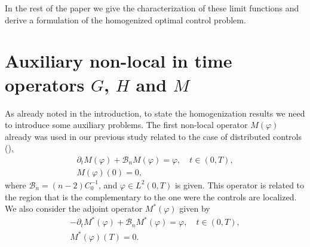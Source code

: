 \documentclass[10pt,a4paper]{amsart}
\numberwithin{equation}{section}
\begin{document}
In the rest of the paper we  give the characterization of these limit
functions and derive a formulation of the homogenized optimal control
problem.

\section{Auxiliary non-local in time operators $G$, $H$ and $M$}\label{sec:aux}

As already  noted in the introduction, to state the homogenization
results we need to introduce some auxiliary problems. The first non-local
operator $M(\varphi )$ already was used in our previous study related to the
case of distributed controls (\cite{DiPoShAttouch}),
\begin{equation}
\begin{gathered}
\partial _{t}M(\varphi )+\mathcal{B}_nM(\varphi )=\varphi , \quad t\in (0,T),\\
M(\varphi )(0)=0, 
\end{gathered}  \label{tilde M prob}
\end{equation}
where $\mathcal{B}_n=(n-2)C_0^{-1}$, and $\varphi \in L^2(0,T)$ is
given. This operator is related to the region that is the complementary to
the one were the controls are localized. We also consider the adjoint
operator $M^{\ast }(\varphi )$ given by%
\begin{equation}
\begin{gathered}
-\partial _{t}M^{\ast }(\varphi )+\mathcal{B}_nM^{\ast }(\varphi )=\varphi, \quad
  t\in (0,T), \\
M^{\ast }(\varphi )(T)=0. 
\end{gathered}  \label{adj tilde M prob}
\end{equation}
\end{document}
